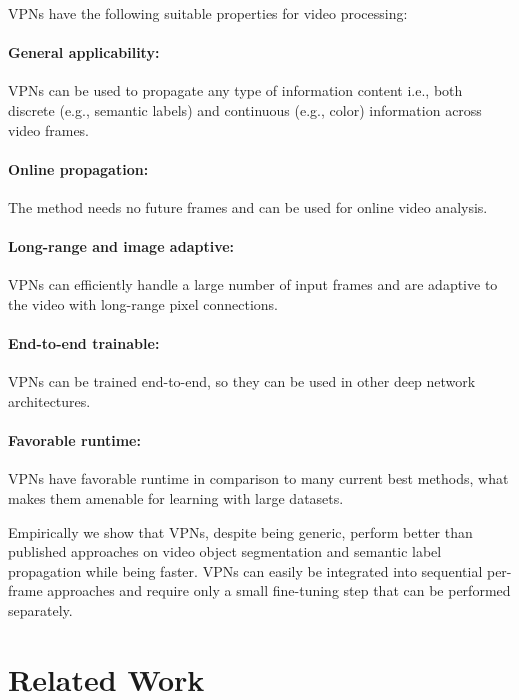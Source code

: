 \documentclass[10pt,twocolumn,letterpaper]{article}
\begin{document}
VPNs have the following suitable properties for video processing:

\vspace{-0.5cm}
\paragraph{General applicability:} VPNs can be used to propagate any
type of information content i.e., both discrete
(e.g., semantic labels) and continuous (e.g., color) information across video frames.
\vspace{-0.5cm}
\paragraph{Online propagation:} The method needs no future frames
and can be used for online video analysis.
\vspace{-0.5cm}
\paragraph{Long-range and image adaptive:} VPNs can efficiently handle a large
number of input frames and are adaptive to the video with long-range pixel connections.
\vspace{-0.5cm}
\paragraph{End-to-end trainable:} VPNs can be trained end-to-end, so they
can be used in other deep network architectures.
\vspace{-0.5cm}
\paragraph{Favorable runtime:} VPNs have favorable runtime in comparison to many current
best methods, what makes them amenable for learning with
large datasets.

Empirically we show that VPNs, despite being generic,
perform better than published approaches on video object segmentation
and semantic label propagation while being faster.
VPNs can easily be integrated into sequential per-frame approaches
and require only a small fine-tuning step that can be performed separately.

\section{Related Work}
\label{sec:related}
\end{document}
